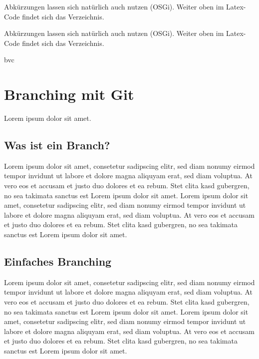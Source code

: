 \documentclass[12pt,a4paper,bibliography=totocnumbered,listof=totocnumbered]{scrartcl}
\begin{document}
Abkürzungen lassen sich natürlich auch nutzen (\ac{OSGi}). Weiter oben im Latex-Code findet sich das Verzeichnis.


Abkürzungen lassen sich natürlich auch nutzen (\ac{OSGi}). Weiter oben im Latex-Code findet sich das Verzeichnis.
\begin{scriptsize}
bvc
\end{scriptsize}
\pagebreak

\section{Branching mit Git}
Lorem ipsum dolor sit amet.

\subsection{Was ist ein Branch?}
Lorem ipsum dolor sit amet, consetetur sadipscing elitr, sed diam nonumy eirmod tempor invidunt ut labore et dolore magna aliquyam erat, sed diam voluptua. At vero eos et accusam et justo duo dolores et ea rebum. Stet clita kasd gubergren, no sea takimata sanctus est Lorem ipsum dolor sit amet. Lorem ipsum dolor sit amet, consetetur sadipscing elitr, sed diam nonumy eirmod tempor invidunt ut labore et dolore magna aliquyam erat, sed diam voluptua. At vero eos et accusam et justo duo dolores et ea rebum. Stet clita kasd gubergren, no sea takimata sanctus est Lorem ipsum dolor sit amet.

\subsection{Einfaches Branching}
Lorem ipsum dolor sit amet, consetetur sadipscing elitr, sed diam nonumy eirmod tempor invidunt ut labore et dolore magna aliquyam erat, sed diam voluptua. At vero eos et accusam et justo duo dolores et ea rebum. Stet clita kasd gubergren, no sea takimata sanctus est Lorem ipsum dolor sit amet. Lorem ipsum dolor sit amet, consetetur sadipscing elitr, sed diam nonumy eirmod tempor invidunt ut labore et dolore magna aliquyam erat, sed diam voluptua. At vero eos et accusam et justo duo dolores et ea rebum. Stet clita kasd gubergren, no sea takimata sanctus est Lorem ipsum dolor sit amet.
\pagebreak

\end{document}
